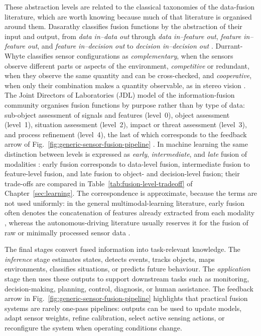 \documentclass[graybox,envcountchap]{style/SNmono}
\begin{document}
These abstraction levels are related to the classical taxonomies of the data-fusion literature, which are worth knowing because much of that literature is organised around them. Dasarathy classifies fusion functions by the abstraction of their input and output, from \emph{data in--data out} through \emph{data in--feature out}, \emph{feature in--feature out}, and \emph{feature in--decision out} to \emph{decision in--decision out} \cite{dasarathy1997_fusion}. Durrant-Whyte classifies sensor configurations as \emph{complementary}, when the sensors observe different parts or aspects of the environment, \emph{competitive} or redundant, when they observe the same quantity and can be cross-checked, and \emph{cooperative}, when only their combination makes a quantity observable, as in stereo vision \cite{durrantwhyte1988_sensor}. The Joint Directors of Laboratories (JDL) model of the information-fusion community organises fusion functions by purpose rather than by type of data: sub-object assessment of signals and features (level~0), object assessment (level~1), situation assessment (level~2), impact or threat assessment (level~3), and process refinement (level~4), the last of which corresponds to the feedback arrow of Fig.~\ref{fig:generic-sensor-fusion-pipeline} \cite{steinberg1999_jdl}. In machine learning the same distinction between levels is expressed as \emph{early}, \emph{intermediate}, and \emph{late} fusion of modalities \cite{baltrusaitis_multimodal_2019}: early fusion corresponds to data-level fusion, intermediate fusion to feature-level fusion, and late fusion to object- and decision-level fusion; their trade-offs are compared in Table~\ref{tab:fusion-level-tradeoff} of Chapter~\ref{sec:learning}. The correspondence is approximate, because the terms are not used uniformly: in the general multimodal-learning literature, early fusion often denotes the concatenation of features already extracted from each modality \cite{baltrusaitis_multimodal_2019}, whereas the autonomous-driving literature usually reserves it for the fusion of raw or minimally processed sensor data \cite{feng2021_multimodal_survey}.


The final stages convert fused information into task-relevant knowledge. The \emph{inference} stage estimates states, detects events, tracks objects, maps environments, classifies situations, or predicts future behaviour. The \emph{application} stage then uses these outputs to support downstream tasks such as monitoring, decision-making, planning, control, diagnosis, or human assistance. The feedback arrow in Fig.~\ref{fig:generic-sensor-fusion-pipeline} highlights that practical fusion systems are rarely one-pass pipelines: outputs can be used to update models, adapt sensor weights, refine calibration, select active sensing actions, or reconfigure the system when operating conditions change.
\end{document}
